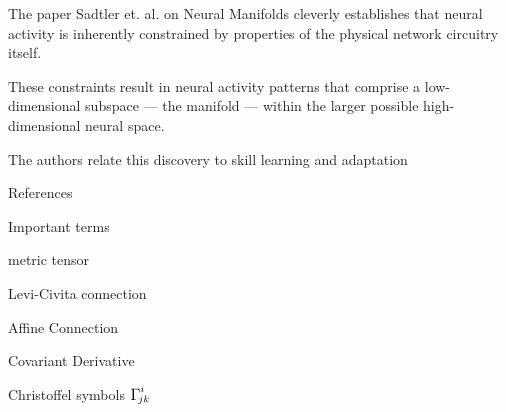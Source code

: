 \documentclass{amsart}
\newcommand{\Christoffel}[2]{\ensuremath{{\mathlarger{\mathlarger\Gamma}}^{#1}\!\!\!_{#2}}}
\begin{document}


The paper Sadtler et. al. on Neural Manifolds cleverly establishes that neural activity is inherently constrained by properties of the physical network circuitry itself.

These constraints result in neural activity patterns that comprise a low-dimensional subspace — the manifold — within the larger possible high-dimensional neural space.

The authors relate this discovery to skill learning and adaptation


\clearpage

References






\clearpage

Important terms

metric tensor

Levi-Civita connection

Affine Connection

Covariant Derivative

Christoffel symbols $ \Christoffel{i}{jk} $
\end{document}
